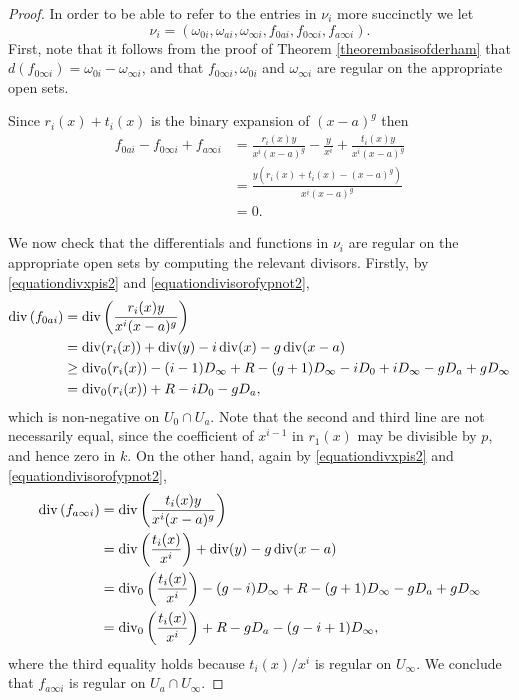     \begin{proof}
    In order to be able to refer to the entries in $\nu_i$ more succinctly we let
        \[
        \nu_i = \left( \omega_{0 i}, \omega_{a i}, \omega_{\infty i}, f_{0 a i}, f_{0 \infty i}, f_{a \infty i} \right).
        \]
    First, note that it follows from the proof of Theorem \ref{theorembasisofderham} that $d(f_{0 \infty i}) = \omega_{0 i} - \omega_{\infty i}$, and that $f_{0 \infty i}, \omega_{0 i}$ and $\omega_{\infty i}$ are regular on the appropriate open sets.
    
    Since $r_i(x)+t_i(x)$ is the binary expansion of $(x-a)^g$ then
        \begin{align*}
        f_{0 a i} - f_{0 \infty i}+ f_{a \infty i} & = \frac{r_i(x)y}{x^i(x-a)^g} - \frac{y}{x^i} + \frac{t_i(x)y}{x^i(x-a)^g} \\
        & = \frac{y(r_i(x) + t_i(x) - (x-a)^g)}{x^i(x-a)^g} \\
        & = 0.
        \end{align*}
    
    

    We now check that the differentials and functions in $\nu_i$ are regular on the appropriate open sets by computing the relevant divisors.
    Firstly, by \eqref{equationdivxpis2} and \eqref{equationdivisorofypnot2},
        \begin{align*}
        \operatorname{div} \left( f_{0 a i} \right) & = \operatorname{div} \left( \frac{r_i(x)y}{x^i(x-a)^g} \right) \\
        &  = \operatorname{div}(r_i(x)) + \operatorname{div}(y) - i\operatorname{div}(x) - g\operatorname{div}(x-a) \\
        & \geq \operatorname{div}_0(r_i(x)) - (i-1)D_\infty +R - (g+1)D_\infty - iD_0 + iD_\infty - gD_a + gD_\infty \\
        & = \operatorname{div}_0(r_i(x)) +R -iD_0 - gD_a,
        \end{align*}
    which is non-negative on $U_0 \cap U_a$.
    Note that the second and third line are not necessarily equal, since the coefficient of $x^{i-1}$ in $r_1(x)$ may be divisible by $p$, and hence zero in $k$.
    On the other hand, again by \eqref{equationdivxpis2} and \eqref{equationdivisorofypnot2},
        \begin{align*}
        \operatorname{div} \left( f_{a \infty i} \right) & = \operatorname{div} \left( \frac{t_i(x)y}{x^i(x-a)^g} \right) \\
        & = \operatorname{div}\left(\frac{t_i(x)}{x^i}\right) + \operatorname{div}(y) - g\operatorname{div}(x-a) \\
        & = \operatorname{div}_0 \left( \frac{t_i(x)}{x^i} \right) - (g-i)D_\infty +R - (g+1)D_\infty - gD_a + gD_\infty\\
        & = \operatorname{div}_0 \left( \frac{t_i(x)}{x^i} \right) +R - gD_a -(g-i+1)D_\infty,
        \end{align*}
    where the third equality holds because $t_i(x)/x^i$ is regular on $U_\infty$.
    We conclude that $f_{a \infty i}$ is regular on $U_a \cap U_\infty$.
    

\end{proof}
